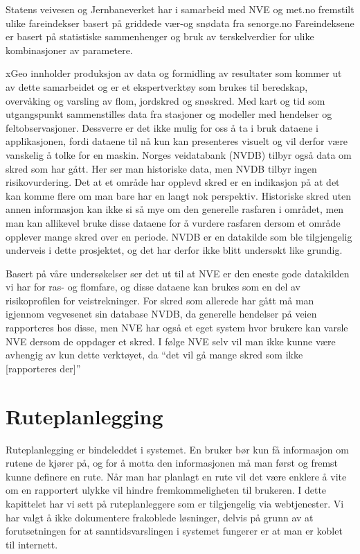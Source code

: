 \documentclass[a4paper,norsk,oneside]{book}
\begin{document}
Statens veivesen og Jernbaneverket har i samarbeid med NVE og met.no fremstilt ulike fareindekser basert på griddede vær-og snødata fra senorge.no
Fareindeksene er basert på statistiske sammenhenger og bruk av terskelverdier for ulike kombinasjoner av parametere. 

xGeo innholder produksjon av data og formidling av resultater som kommer ut av dette samarbeidet og er et ekspertverktøy som brukes til beredskap, overvåking og varsling av flom, jordskred og snøskred.\cite{xgeo} Med kart og tid som utgangspunkt sammenstilles data fra stasjoner og modeller med hendelser og feltobservasjoner. Dessverre er det ikke mulig for oss å ta i bruk dataene i applikasjonen, fordi dataene til nå kun kan presenteres visuelt og vil derfor være vanskelig å tolke for en maskin.
	Norges veidatabank (NVDB) tilbyr også data om skred som har gått. Her ser man historiske data, men NVDB tilbyr ingen risikovurdering. Det at et område har opplevd skred er en indikasjon på at det kan komme flere om man bare har en langt nok perspektiv.  Historiske skred uten annen informasjon kan ikke si så mye om den generelle rasfaren i området, men man kan allikevel bruke disse dataene for å vurdere rasfaren dersom et område opplever mange skred over en periode. NVDB er en datakilde som ble tilgjengelig underveis i dette prosjektet, og det har derfor ikke blitt undersøkt like grundig.

Basert på våre undersøkelser ser det ut til at NVE er den eneste gode datakilden vi har for ras- og flomfare, og disse dataene kan brukes som en del av risikoprofilen for veistrekninger. For skred som allerede har gått må man igjennom vegvesenet sin database NVDB, da generelle hendelser på veien rapporteres hos disse, men NVE har også et eget system hvor brukere kan varsle NVE dersom de oppdager et skred. I følge NVE selv vil man ikke kunne være avhengig av kun dette verktøyet, da “det vil gå mange skred som ikke [rapporteres der]”\cite{nve}

\section{Ruteplanlegging}
Ruteplanlegging er bindeleddet i systemet. En bruker bør kun få informasjon om rutene de kjører på, og for å motta den informasjonen må man først og fremst kunne definere en rute. Når man har planlagt en rute vil det være enklere å vite om en rapportert ulykke vil hindre fremkommeligheten til brukeren. I dette kapittelet har vi sett på ruteplanleggere som er tilgjengelig via webtjenester. Vi har valgt å ikke dokumentere frakoblede løsninger, delvis på grunn av at forutsetningen for at sanntidsvarslingen i systemet fungerer er at man er koblet til internett.
\end{document}
